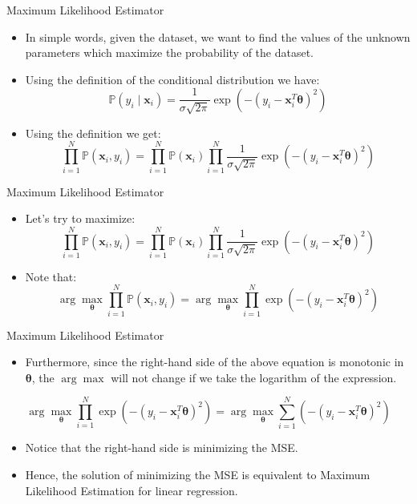 \begin{frame}{Maximum Likelihood Estimator}

\begin{itemize}
    \item In simple words, given the dataset, we want to find the values of the unknown parameters which maximize the probability of the dataset.
    
    \item Using the definition of the conditional distribution we have:
\[
\mathbb{P}(y_i \mid \mathbf{x}_i) = \frac{1}{\sigma \sqrt{2\pi}} \exp\left( - (y_i - \mathbf{x}_i^T \boldsymbol{\theta})^2 \right)
\]

    \item Using the definition we get:
\[
\prod_{i=1}^{N} \mathbb{P}(\mathbf{x}_i, y_i) = \prod_{i=1}^{N} \mathbb{P}(\mathbf{x}_i) \prod_{i=1}^{N} \frac{1}{\sigma \sqrt{2\pi}} \exp\left( - (y_i - \mathbf{x}_i^T \boldsymbol{\theta})^2 \right)
\]
\end{itemize}

\end{frame}


\begin{frame}{Maximum Likelihood Estimator}

\begin{itemize}
    \item Let’s try to maximize:
\[
\prod_{i=1}^{N} \mathbb{P}(\mathbf{x}_i, y_i) 
= \prod_{i=1}^{N} \mathbb{P}(\mathbf{x}_i) \prod_{i=1}^{N} \frac{1}{\sigma \sqrt{2\pi}} \exp\left( - (y_i - \mathbf{x}_i^T \boldsymbol{\theta})^2 \right)
\]

    \item Note that:
\[
\arg \max_{\boldsymbol{\theta}} \prod_{i=1}^{N} \mathbb{P}(\mathbf{x}_i, y_i)
= \arg \max_{\boldsymbol{\theta}} \prod_{i=1}^{N} \exp\left( - (y_i - \mathbf{x}_i^T \boldsymbol{\theta})^2 \right)
\]
\end{itemize}

\end{frame}

\begin{frame}{Maximum Likelihood Estimator}

\begin{itemize}
    \item Furthermore, since the right-hand side of the above equation is monotonic in $\boldsymbol{\theta}$, the $\arg \max$ will not change if we take the logarithm of the expression.
\end{itemize}

\[
\arg \max_{\boldsymbol{\theta}} \prod_{i=1}^{N} \exp \left( - (y_i - \mathbf{x}_i^T \boldsymbol{\theta})^2 \right)
= \arg \max_{\boldsymbol{\theta}} \sum_{i=1}^{N} \left( - (y_i - \mathbf{x}_i^T \boldsymbol{\theta})^2 \right)
\]

\begin{itemize}
    \item Notice that the right-hand side is minimizing the MSE.
    \item Hence, the solution of minimizing the MSE is equivalent to Maximum Likelihood Estimation for linear regression.
\end{itemize}

\end{frame}
